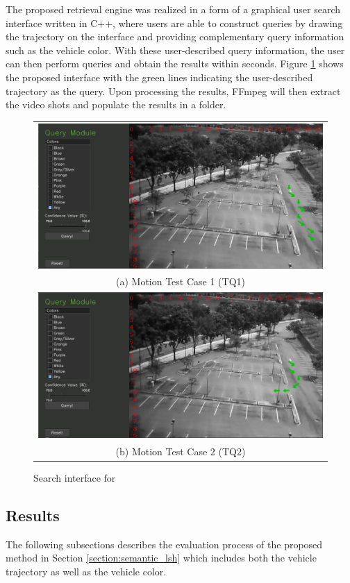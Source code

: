 The proposed retrieval engine was realized in a form of a graphical user search interface written in C++, where users are able to construct queries by drawing the trajectory on the interface and providing complementary query information such as the vehicle color. With these user-described query information, the user can then perform queries and obtain the results within seconds. Figure \ref{fig:versionOneInterface} shows the proposed interface with the green lines indicating the user-described trajectory as the query. Upon processing the results, FFmpeg will then extract the video shots and populate the results in a folder.





\begin{figure}[htb!]
	\centering
	\begin{tabular}{c}
		\includegraphics[width=0.7\linewidth]{image/retrievalOne/test1-8inputs.PNG} \\  
		(a) Motion Test Case 1 (TQ1) \\
		\includegraphics[width=0.7\linewidth]{image/retrievalOne/test2-6input.PNG}\\
		(b) Motion Test Case 2 (TQ2)
	\end{tabular}
	\caption{Search interface for \versionOne} 
	\label{fig:versionOneInterface}
\end{figure}




\subsection{Results}
The following subsections describes the evaluation process of the proposed method in Section \ref{section:semantic_lsh} which includes both the vehicle trajectory as well as the vehicle color.    


